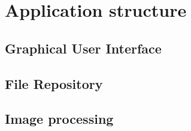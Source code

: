 \chapter{Application structure}
\label{chap:ch5}

\section{Graphical User Interface}
\label{sec:ch5sec1}

\section{File Repository}
\label{sec:ch5sec2}

\section{Image processing}
\label{sec:ch5sec3}
